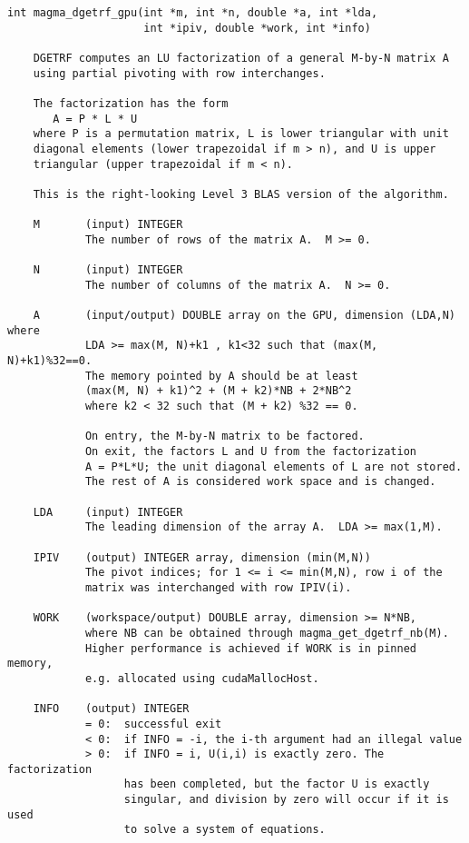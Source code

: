 \documentclass[10pt]{book}
\begin{document}
\begin{verbatim}
int magma_dgetrf_gpu(int *m, int *n, double *a, int *lda, 
                     int *ipiv, double *work, int *info)
   
    DGETRF computes an LU factorization of a general M-by-N matrix A   
    using partial pivoting with row interchanges.   

    The factorization has the form   
       A = P * L * U   
    where P is a permutation matrix, L is lower triangular with unit   
    diagonal elements (lower trapezoidal if m > n), and U is upper   
    triangular (upper trapezoidal if m < n).   

    This is the right-looking Level 3 BLAS version of the algorithm.   

    M       (input) INTEGER   
            The number of rows of the matrix A.  M >= 0.   

    N       (input) INTEGER   
            The number of columns of the matrix A.  N >= 0.   

    A       (input/output) DOUBLE array on the GPU, dimension (LDA,N) where
            LDA >= max(M, N)+k1 , k1<32 such that (max(M, N)+k1)%32==0.
            The memory pointed by A should be at least 
            (max(M, N) + k1)^2 + (M + k2)*NB + 2*NB^2
            where k2 < 32 such that (M + k2) %32 == 0.
                 
            On entry, the M-by-N matrix to be factored.   
            On exit, the factors L and U from the factorization   
            A = P*L*U; the unit diagonal elements of L are not stored.   
            The rest of A is considered work space and is changed.

    LDA     (input) INTEGER   
            The leading dimension of the array A.  LDA >= max(1,M).   

    IPIV    (output) INTEGER array, dimension (min(M,N))   
            The pivot indices; for 1 <= i <= min(M,N), row i of the   
            matrix was interchanged with row IPIV(i).   

    WORK    (workspace/output) DOUBLE array, dimension >= N*NB,
            where NB can be obtained through magma_get_dgetrf_nb(M).
            Higher performance is achieved if WORK is in pinned memory, 
            e.g. allocated using cudaMallocHost.

    INFO    (output) INTEGER   
            = 0:  successful exit   
            < 0:  if INFO = -i, the i-th argument had an illegal value   
            > 0:  if INFO = i, U(i,i) is exactly zero. The factorization   
                  has been completed, but the factor U is exactly   
                  singular, and division by zero will occur if it is used   
                  to solve a system of equations.   
\end{verbatim}
\end{document}
